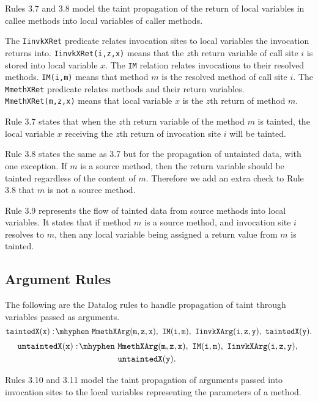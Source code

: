 Rules 3.7 and 3.8 model the taint propagation of the return of local
variables in callee methods into local variables of caller methods.

The \texttt{IinvkXRet} predicate relates invocation sites to local
variables the invocation returns into. \texttt{IinvkXRet(i,z,x)} means
that the $z$th return variable of call site $i$ is stored into local
variable $x$. The \texttt{IM} relation relates invocations to their
resolved methods. \texttt{IM(i,m)} means that method $m$ is the
resolved method of call site $i$. The \texttt{MmethXRet} predicate
relates methods and their return variables. \texttt{MmethXRet(m,z,x)}
means that local variable $x$ is the $z$th return of method $m$.

Rule 3.7 states that when the $z$th return variable of the method $m$
is tainted, the local variable $x$ receiving the $z$th return of
invocation site $i$ will be tainted.

Rule 3.8 states the same as 3.7 but for the propagation of untainted
data, with one exception. If $m$ is a source method, then the return
variable should be tainted regardless of the content of $m$. Therefore
we add an extra check to Rule 3.8 that $m$ is not a source method.

Rule 3.9 represents the flow of tainted data from source methods into
local variables. It states that if method $m$ is a source method, and
invocation site $i$ resolves to $m$, then any local variable being
assigned a return value from $m$ is tainted.
\subsection{Argument Rules}
The following are the Datalog rules to handle propagation of taint
through variables passed as arguments.
\begin{equation}
  \mathtt{taintedX(x) \is MmethXArg(m,z,x) \also IM(i,m) \also
    IinvkXArg(i,z,y) \also taintedX(y).}
\end{equation}
\begin{equation}
  \begin{split}
    \mathtt{untaintedX(x) \is} & \mathtt{MmethXArg(m,z,x) \also
      IM(i,m) \also IinvkXArg(i,z,y) \also} \\ &
    \mathtt{untaintedX(y).} \\
  \end{split}
\end{equation}

Rules 3.10 and 3.11 model the taint propagation of arguments passed
into invocation sites to the local variables representing the
parameters of a method.

